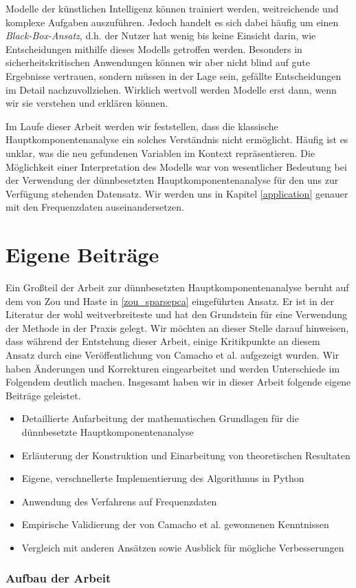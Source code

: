Modelle der künstlichen Intelligenz können trainiert werden, weitreichende und komplexe Aufgaben auszuführen. Jedoch handelt es sich dabei häufig um einen \textit{Black-Box-Ansatz}, d.h. der Nutzer hat wenig bis keine Einsicht darin, wie Entscheidungen mithilfe dieses Modells getroffen werden. Besonders in sicherheitskritischen Anwendungen können wir aber nicht blind auf gute Ergebnisse vertrauen, sondern müssen in der Lage sein, gefällte Entscheidungen im Detail nachzuvollziehen. Wirklich wertvoll werden Modelle erst dann, wenn wir sie verstehen und erklären können.

Im Laufe dieser Arbeit werden wir feststellen, dass die klassische Hauptkomponentenanalyse ein solches Verständnis nicht ermöglicht. Häufig ist es unklar, was die neu gefundenen Variablen im Kontext repräsentieren. Die Möglichkeit einer Interpretation des Modells war von wesentlicher Bedeutung bei der Verwendung der dünnbesetzten Hauptkomponentenanalyse für den uns zur Verfügung stehenden Datensatz. Wir werden uns in Kapitel \ref{application} genauer mit den Frequenzdaten auseinandersetzen.




\section{Eigene Beiträge}

Ein Großteil der Arbeit zur dünnbesetzten Hauptkomponentenanalyse beruht auf dem von Zou und Haste in \ref{zou_sparsepca} eingeführten Ansatz. Er ist in der Literatur der wohl weitverbreiteste und hat den Grundstein für eine Verwendung der Methode in der Praxis gelegt. Wir möchten an dieser Stelle darauf hinweisen, dass während der Entstehung dieser Arbeit, einige Kritikpunkte an diesem Ansatz durch eine Veröffentlichung von Camacho et al. aufgezeigt wurden. Wir haben Änderungen und Korrekturen eingearbeitet und werden Unterschiede im Folgendem deutlich machen. Insgesamt haben wir in dieser Arbeit folgende eigene Beiträge geleistet.
\begin{itemize}
\item Detaillierte Aufarbeitung der mathematischen Grundlagen für die dünnbesetzte Hauptkomponentenanalyse
\item Erläuterung der Konstruktion und Einarbeitung von theoretischen Resultaten
\item Eigene, verschnellerte Implementierung des Algorithmus in Python
\item Anwendung des Verfahrens auf Frequenzdaten
\item Empirische Validierung der von Camacho et al. gewonnenen Kenntnissen
\item Vergleich mit anderen Ansätzen sowie Ausblick für mögliche Verbesserungen
\end{itemize}

\subsubsection{Aufbau der Arbeit}